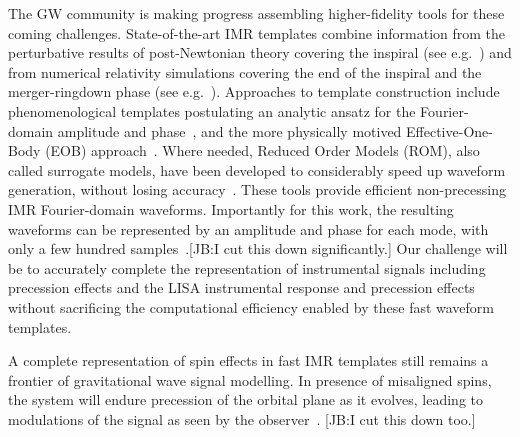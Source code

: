 \documentclass[aps,showpacs,twocolumn,
prd,superscriptaddress,nofootinbib]{revtex4-1}
\newcommand{\jgb}[1]{{\color{DarkGreen} #1}}
\begin{document}

\jgb{The GW community is making progress assembling higher-fidelity tools for these coming challenges.
State-of-the-art IMR templates combine information from the perturbative results of post-Newtonian theory covering the inspiral (see e.g.~\cite{BlanchetLiving}) and from numerical relativity simulations covering the end of the inspiral and the merger-ringdown phase (see e.g.~\cite{Pfeiffer12}).  Approaches to template construction include phenomenological templates postulating an analytic ansatz for the Fourier-domain amplitude and phase~\cite{Husa+15, Khan+15,Hannam+13}, and the more physically motived Effective-One-Body (EOB) approach~\cite{BD99,Taracchini+13, Pan+13, Bohe+16}. Where needed, Reduced Order Models (ROM), also called surrogate models, have been developed to considerably speed up waveform generation, without losing accuracy~\cite{Field+13, Puerrer14, Bohe+16}. These tools provide efficient non-precessing IMR Fourier-domain waveforms. Importantly for this work, the resulting waveforms can be represented by an amplitude and phase for each mode, with only a few hundred samples~\cite{Puerrer14}.[JB:I cut this down significantly.]} Our challenge will be to accurately complete the representation of instrumental signals including precession effects and the LISA instrumental response and precession effects without sacrificing the computational efficiency enabled by these fast waveform templates.

A complete representation of spin effects in fast IMR templates still remains a frontier of gravitational wave signal modelling. In presence of misaligned spins, the system will endure precession of the orbital plane as it evolves, leading to modulations of the signal as seen by the observer~\cite{ACST94}.
\jgb{[JB:I cut this down too.]}
\end{document}

